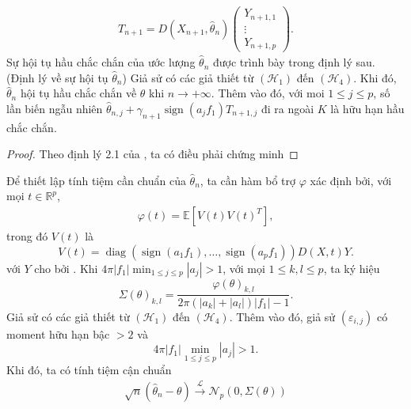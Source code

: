 \begin{align}
    T_{n+1}=D\left(X_{n+1}, \widehat{\theta}_{n}\right)\left(\begin{array}{c}
    Y_{n+1,1} \\
    \vdots \\
    Y_{n+1, p}
    \end{array}\right).
    \label{4.7}
\end{align}
Sự hội tụ hầu chắc chắn của ước lượng $\widehat{\theta}_{n}$ được trình bày trong định lý sau.
{\dl \label{dl4.1} (Định lý về sự hội tụ $\widehat{\theta}_{n}$) Giả sử có các giả thiết từ  $\left(\mathcal{H}_{1}\right)$ đến $\left(\mathcal{H}_{4}\right)$. Khi đó, $\widehat{\theta}_{n}$ hội tụ hầu chắc chắn về $\theta$ khi $n \rightarrow +\infty$. Thêm vào đó, với moi $1 \leq j \leq p$, số lần biến ngẫu nhiên $\widehat{\theta}_{n, j}+\gamma_{n+1} \operatorname{sign}\left(a_{j} f_{1}\right) T_{n+1, j}$ đi ra ngoài $K$ là hữu hạn hầu chắc chắn.}
\begin{proof}
    Theo định lý 2.1 của \cite{bercu}, ta có điều phải chứng minh
\end{proof}
Để thiết lập tính tiệm cần chuẩn của $\widehat{\theta}_{n}$, ta cần hàm bổ trợ $\varphi$ xác định bởi, với mọi $t \in \mathbb{R}^{p}$,
\begin{align}
    \varphi(t)=\mathbb{E}\left[V(t) V(t)^{T}\right],
    \label{4.8}
\end{align}
trong đó $V(t)$ là
$$
V(t)=\operatorname{diag}\left(\operatorname{sign}\left(a_{1} f_{1}\right), \ldots, \operatorname{sign}\left(a_{p} f_{1}\right)\right) D(X, t) Y.
$$
với $Y$ cho bởi . Khi $4 \pi\left|f_{1}\right| \min _{1 \leq j \leq p}\left|a_{j}\right|>1$, với mọi $1 \leq k, l \leq p$, ta ký hiệu
$$
\Sigma(\theta)_{k, l}=\frac{\varphi(\theta)_{k, l}}{2 \pi\left(\left|a_{k}\right|+\left|a_{l}\right|\right)\left|f_{1}\right|-1}.
$$
{\dl \label{dl4.2} Giả sử có các giả thiết từ $\left(\mathcal{H}_{1}\right)$ đến $\left(\mathcal{H}_{4}\right)$. Thêm vào đó, giả sử $\left(\varepsilon_{i, j}\right)$ có moment hữu hạn bậc $>2$ và 
$$
4 \pi\left|f_{1}\right| \min _{1 \leq j \leq p}\left|a_{j}\right|>1 .
$$
Khi đó, ta có tính tiệm cận chuẩn
\begin{align}
    \sqrt{n}\left(\widehat{\theta}_{n}-\theta\right) \stackrel{\mathcal{L}}{\longrightarrow} \mathcal{N}_{p}(0, \Sigma(\theta))
    \label{4.9}
\end{align}}
